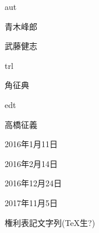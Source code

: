 
\begin{rdnames}{aut}%
\item {青木峰郎}
\item {武藤健志}
\end{rdnames}

\begin{rdnames}{trl}%
\item {角征典}
\end{rdnames}

\begin{rdnames}{edt}%
\item {高橋征義}
\end{rdnames}



\begin{rdhistory}
\begin{rdedition}
\item {2016年1月11日} %
\item {2016年2月14日} %
\end{rdedition}
\begin{rdedition}
\item {2016年12月24日} %
\item {2017年11月5日} %
\end{rdedition}
\end{rdhistory}
\begin{rdrights}
権利表記文字列(TeX生?)
\end{rdrights}

